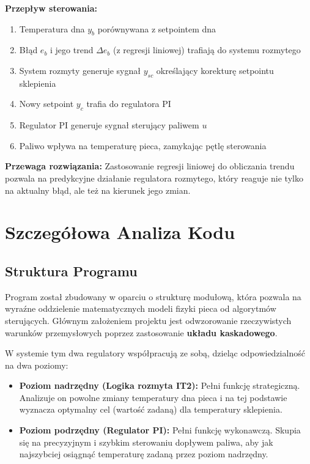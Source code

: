 \documentclass[12pt,a4paper]{article}
\begin{document}
\textbf{Przepływ sterowania:}
\begin{enumerate}
    \item Temperatura dna $y_b$ porównywana z setpointem dna
    \item Błąd $e_b$ i jego trend $\Delta e_b$ (z regresji liniowej) trafiają do systemu rozmytego
    \item System rozmyty generuje sygnał $y_{sc}$ określający korekturę setpointu sklepienia
    \item Nowy setpoint $y_c$ trafia do regulatora PI
    \item Regulator PI generuje sygnał sterujący paliwem $u$
    \item Paliwo wpływa na temperaturę pieca, zamykając pętlę sterowania
\end{enumerate}

\textbf{Przewaga rozwiązania:}
Zastosowanie regresji liniowej do obliczania trendu pozwala na predykcyjne działanie regulatora rozmytego, który reaguje nie tylko na aktualny błąd, ale też na kierunek jego zmian.



\section{Szczegółowa Analiza Kodu}

\subsection{Struktura Programu}



Program został zbudowany w oparciu o strukturę modułową, która pozwala na wyraźne oddzielenie matematycznych modeli fizyki pieca od algorytmów sterujących. Głównym założeniem projektu jest odwzorowanie rzeczywistych warunków przemysłowych poprzez zastosowanie \textbf{układu kaskadowego}.

W systemie tym dwa regulatory współpracują ze sobą, dzieląc odpowiedzialność na dwa poziomy:
\begin{itemize}
    \item \textbf{Poziom nadrzędny (Logika rozmyta IT2):} Pełni funkcję strategiczną. Analizuje on powolne zmiany temperatury dna pieca i na tej podstawie wyznacza optymalny cel (wartość zadaną) dla temperatury sklepienia.
    \item \textbf{Poziom podrzędny (Regulator PI):} Pełni funkcję wykonawczą. Skupia się na precyzyjnym i szybkim sterowaniu dopływem paliwa, aby jak najszybciej osiągnąć temperaturę zadaną przez poziom nadrzędny.
\end{itemize}
\end{document}
